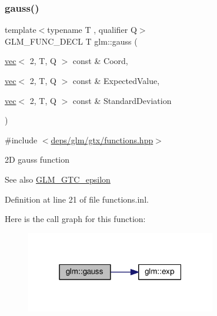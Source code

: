 \subsubsection{\texorpdfstring{gauss()}{gauss()}\hspace{0.1cm}{\footnotesize\ttfamily [2/2]}}
{\footnotesize\ttfamily template$<$typename T , qualifier Q$>$ \\
G\+L\+M\+\_\+\+F\+U\+N\+C\+\_\+\+D\+E\+CL T glm\+::gauss (\begin{DoxyParamCaption}\item[{\hyperlink{structglm_1_1vec}{vec}$<$ 2, T, Q $>$ const \&}]{Coord,  }\item[{\hyperlink{structglm_1_1vec}{vec}$<$ 2, T, Q $>$ const \&}]{Expected\+Value,  }\item[{\hyperlink{structglm_1_1vec}{vec}$<$ 2, T, Q $>$ const \&}]{Standard\+Deviation }\end{DoxyParamCaption})}



{\ttfamily \#include $<$\hyperlink{functions_8hpp}{deps/glm/gtx/functions.\+hpp}$>$}

2D gauss function

\begin{DoxySeeAlso}{See also}
\hyperlink{group__gtc__epsilon}{G\+L\+M\+\_\+\+G\+T\+C\+\_\+epsilon} 
\end{DoxySeeAlso}


Definition at line 21 of file functions.\+inl.

Here is the call graph for this function\+:
\nopagebreak
\begin{figure}[H]
\begin{center}
\leavevmode
\includegraphics[width=235pt]{d6/dab/group__gtx__functions_gad19ec8754a83c0b9a8dc16b7e60705ab_cgraph}
\end{center}
\end{figure}
